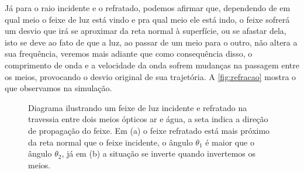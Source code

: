 Já para o raio incidente e o refratado, podemos afirmar que, dependendo de em qual meio o feixe de luz está vindo e pra qual meio ele está indo, o feixe sofrerá um desvio que irá se aproximar da reta normal à superfície, ou se afastar dela, isto se deve ao fato de que a luz, ao passar de um meio para o outro, não altera a sua frequência, veremos mais adiante que como consequência disso, o comprimento de onda e a velocidade da onda sofrem mudanças na passagem entre os meios, provocando o desvio original de sua trajetória. A \autoref{fig:refracao} mostra o que observamos na simulação.

\vspace{5pt}
\begin{figure}[!ht]        
    \centering              
    \hfill
    \caption{Diagrama ilustrando um feixe de luz incidente e refratado na travessia entre dois meios ópticos ar e água, a seta indica a direção de propagação do feixe. Em (a) o feixe refratado está mais próximo da reta normal que o feixe incidente, o ângulo $\theta_1$ é maior que o ângulo $\theta_2$, já em (b) a situação se inverte quando invertemos os meios.}
    \label{fig:refracao}
  \end{figure}
\vspace*{20pt}

